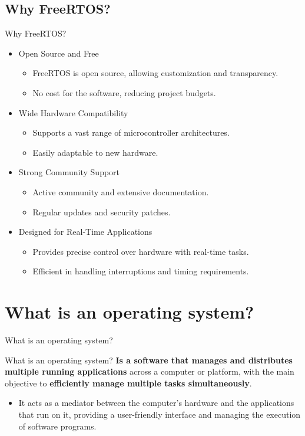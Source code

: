 \documentclass[10pt]{beamer}
\begin{document}
\subsection{Why FreeRTOS?}
\begin{frame}{Why FreeRTOS?}
  \begin{itemize}
    \item Open Source and Free
        \begin{itemize}
            \item FreeRTOS is open source, allowing customization and transparency.
            \item No cost for the software, reducing project budgets.
        \end{itemize}
    \item Wide Hardware Compatibility
        \begin{itemize}
            \item Supports a vast range of microcontroller architectures.
            \item Easily adaptable to new hardware.
        \end{itemize}
    \item Strong Community Support
        \begin{itemize}
            \item Active community and extensive documentation.
            \item Regular updates and security patches.
        \end{itemize}
    \item Designed for Real-Time Applications
        \begin{itemize}
            \item Provides precise control over hardware with real-time tasks.
            \item Efficient in handling interruptions and timing requirements.
        \end{itemize}
  \end{itemize}
\end{frame}

\section{What is an operating system?}
    \begin{frame}{What is an operating system?}

      \begin{block}{What is an operating system?}
        \textbf{Is a software that manages and distributes multiple running applications} across a computer or platform, with the main objective to \textbf{efficiently manage multiple tasks simultaneously}.
      \end{block}
      \begin{itemize}
        \item It acts as a mediator between the computer's hardware and the applications that run on it, providing a user-friendly interface and managing the execution of software programs.
      \end{itemize}
    \end{frame}
\end{document}
